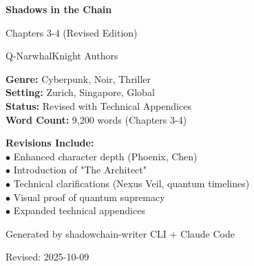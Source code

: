 \documentclass[12pt,oneside]{book}
\begin{document}
\begin{titlepage}
\centering
\vspace*{2cm}

{\Huge\bfseries\color{neongreen} Shadows in the Chain \par}
\vspace{0.5cm}
{\LARGE\color{neonblue} Chapters 3-4 (Revised Edition) \par}
\vspace{1.5cm}

{\Large\color{neonblue} Q-NarwhalKnight Authors \par}
\vspace{2cm}

{\color{darkbg}
\begin{tcolorbox}[colback=darkbg,colframe=neonblue,arc=0pt,outer arc=0pt]
\color{neongreen}\textbf{Genre:} Cyberpunk, Noir, Thriller\\
\color{neongreen}\textbf{Setting:} Zurich, Singapore, Global\\
\color{neongreen}\textbf{Status:} Revised with Technical Appendices\\
\color{neongreen}\textbf{Word Count:} 9,200 words (Chapters 3-4)
\end{tcolorbox}
}

\vspace{1cm}

{\large\color{matrixgreen}\textbf{Revisions Include:}\\
$\bullet$ Enhanced character depth (Phoenix, Chen)\\
$\bullet$ Introduction of "The Architect"\\
$\bullet$ Technical clarifications (Nexus Veil, quantum timelines)\\
$\bullet$ Visual proof of quantum supremacy\\
$\bullet$ Expanded technical appendices
\par}

\vfill
{\large\color{matrixgreen} Generated by shadowchain-writer CLI + Claude Code \par}
{\color{neonblue} Revised: 2025-10-09 \par}

\end{titlepage}

\newpage
\tableofcontents
\newpage




\end{document}
